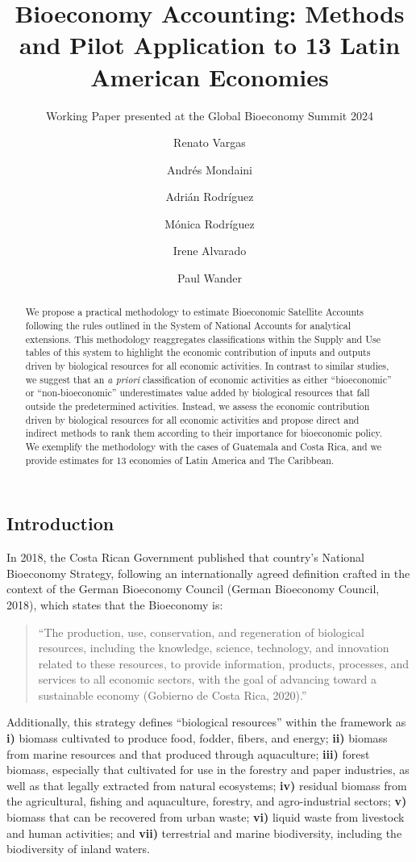 \documentclass[
  letterpaper,
  DIV=11,
  numbers=noendperiod]{scrartcl}
\title{Bioeconomy Accounting: Methods and Pilot Application to 13 Latin
American Economies}
\subtitle{Working Paper presented at the Global Bioeconomy Summit 2024}
\author{Renato Vargas \and Andrés Mondaini \and Adrián
Rodríguez \and Mónica Rodríguez \and Irene Alvarado \and Paul Wander}
\date{}
\begin{document}
\maketitle
\begin{abstract}
We propose a practical methodology to estimate Bioeconomic Satellite
Accounts following the rules outlined in the System of National Accounts
for analytical extensions. This methodology reaggregates classifications
within the Supply and Use tables of this system to highlight the
economic contribution of inputs and outputs driven by biological
resources for all economic activities. In contrast to similar studies,
we suggest that an \emph{a priori} classification of economic activities
as either ``bioeconomic'' or ``non-bioeconomic'' underestimates value
added by biological resources that fall outside the predetermined
activities. Instead, we assess the economic contribution driven by
biological resources for all economic activities and propose direct and
indirect methods to rank them according to their importance for
bioeconomic policy. We exemplify the methodology with the cases of
Guatemala and Costa Rica, and we provide estimates for 13 economies of
Latin America and The Caribbean.
\end{abstract}

\subsection{Introduction}\label{introduction}

In 2018, the Costa Rican Government published that country's National
Bioeconomy Strategy, following an internationally agreed definition
crafted in the context of the German Bioeconomy Council (German
Bioeconomy Council, 2018), which states that the Bioeconomy is:

\begin{quote}
``The production, use, conservation, and regeneration of biological
resources, including the knowledge, science, technology, and innovation
related to these resources, to provide information, products, processes,
and services to all economic sectors, with the goal of advancing toward
a sustainable economy (Gobierno de Costa Rica, 2020).''
\end{quote}

Additionally, this strategy defines ``biological resources'' within the
framework as \textbf{i)} biomass cultivated to produce food, fodder,
fibers, and energy; \textbf{ii)} biomass from marine resources and that
produced through aquaculture; \textbf{iii)} forest biomass, especially
that cultivated for use in the forestry and paper industries, as well as
that legally extracted from natural ecosystems; \textbf{iv)} residual
biomass from the agricultural, fishing and aquaculture, forestry, and
agro-industrial sectors; \textbf{v)} biomass that can be recovered from
urban waste; \textbf{vi)} liquid waste from livestock and human
activities; and \textbf{vii)} terrestrial and marine biodiversity,
including the biodiversity of inland waters.
\end{document}
